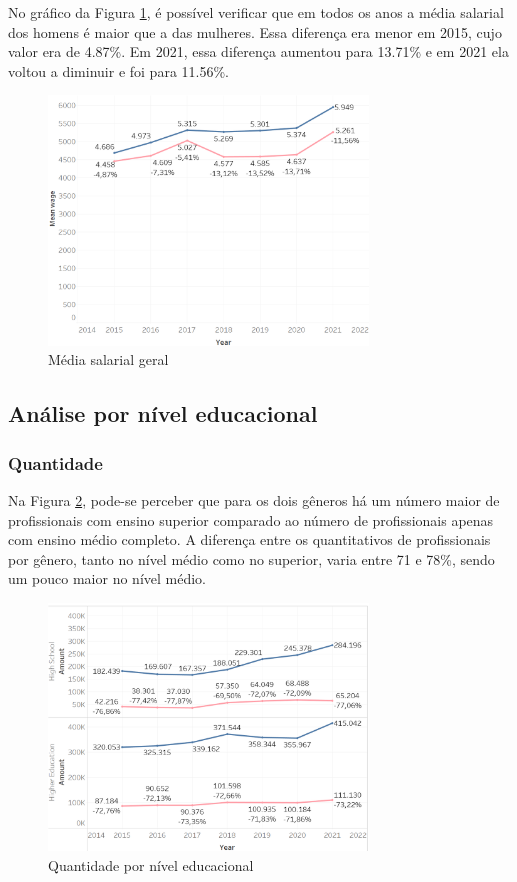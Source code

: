 No gráfico da Figura \ref{fig_1_sal}, é possível verificar que em todos os anos a média salarial dos homens é maior que a das mulheres. Essa diferença era menor em 2015, cujo valor era de 4.87\%. Em 2021, essa diferença aumentou para 13.71\% e em 2021 ela voltou a diminuir e foi para 11.56\%.

\begin{figure}[htbp]
	\centerline{
		\includegraphics[width=85mm]{assets/1_sal.PNG}
	}
	\caption{Média salarial geral}
	\label{fig_1_sal}
\end{figure}


\subsection{Análise por nível educacional}  \label{sub:educ}

\subsubsection{Quantidade}

Na Figura \ref{fig_2_qnt_educ}, pode-se perceber que para os dois gêneros há um número maior de profissionais com ensino superior comparado ao número de profissionais apenas com ensino médio completo. A diferença entre os quantitativos de profissionais por gênero, tanto no nível médio como no superior, varia entre 71 e 78\%, sendo um pouco maior no nível médio.

\begin{figure}[htbp]
	\centerline{
		\includegraphics[width=85mm]{assets/2_qnt_educ.PNG}
	}
	\caption{Quantidade por nível educacional}
	\label{fig_2_qnt_educ}
\end{figure}

